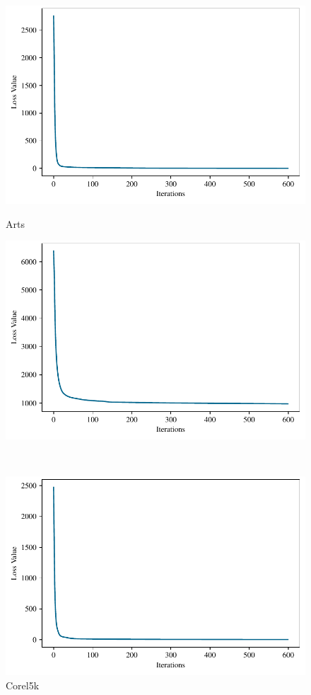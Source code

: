 \begin{figure}
	\centering
	\begin{minipage}[b]{0.48\textwidth}
		\centering
		\includegraphics[width=\textwidth]{figures/Convergence/Convergence(Arts).pdf}
		\caption*{\centering Arts}
	\end{minipage}\hfill
	\begin{minipage}[b]{0.48\textwidth}
		\centering
		\includegraphics[width=\textwidth]{figures/Convergence/Convergence(Corel5k).pdf}
		\caption*{\centering Corel5k}
	\end{minipage}
	\\[0.5cm]
	\begin{minipage}[b]{0.48\textwidth}
		\centering
		\includegraphics[width=\textwidth]{figures/Convergence/Convergence(Health).pdf}

\end{minipage}
\end{figure}

